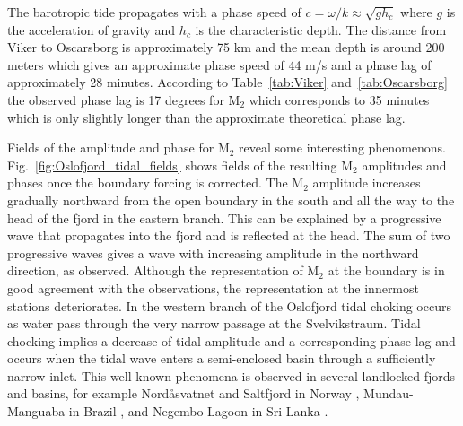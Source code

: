 The barotropic tide propagates with a phase speed of $c = \omega/k \approx \sqrt{g h_c}$ where $g$ is the acceleration of gravity and $h_c$ is the characteristic depth. The distance from Viker to Oscarsborg is approximately 75 km and the mean depth is around 200 meters which gives an approximate phase speed of 44 m/s and a phase lag of approximately 28 minutes. According to Table~\ref{tab:Viker} and~\ref{tab:Oscarsborg} the observed phase lag is 17 degrees for M$_2$ which corresponds to 35 minutes which is only slightly longer than the approximate theoretical phase lag. 

Fields of the amplitude and phase for M$_2$ reveal some interesting phenomenons. Fig.~\ref{fig:Oslofjord_tidal_fields} shows fields of the resulting M$_2$ amplitudes and phases once the boundary forcing is corrected. 
The M$_2$ amplitude increases gradually northward from the open boundary in the south and all the way to the head of the fjord in the eastern branch. 
This can be explained by a progressive wave that propagates into the fjord and is reflected at the head.
The sum of two progressive waves gives a wave with increasing amplitude in the northward direction, as observed. 
Although the representation of M$_2$ at the boundary is in good agreement with the observations, the representation at the innermost stations deteriorates.
In the western branch of the Oslofjord tidal choking occurs as water pass through the very narrow passage at the Svelvikstraum. Tidal chocking implies a decrease of tidal amplitude and a corresponding phase lag \cite[]{stigebrandt80} and occurs when the tidal wave enters a semi-enclosed basin through a sufficiently narrow inlet. This well-known phenomena is observed in several landlocked fjords and basins, for example Nord{\aa}svatnet and Saltfjord in Norway \cite[]{glenne63,eliassen01}, Mundau-Manguaba in Brazil \cite[]{oliveira93}, and Negembo Lagoon in Sri Lanka \cite[]{rydberg96}. 


